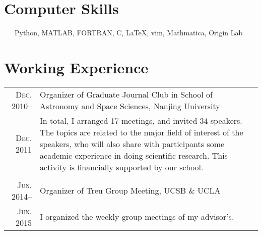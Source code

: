 \documentclass[letterpaper,10pt]{article}
\begin{document}
\vspace{1em}
\section{Computer Skills}
~~~Python, MATLAB, FORTRAN, C, \LaTeX, vim, Mathmatica, Origin Lab


\vspace{1em}
\section{Working Experience}
\begin{tabular}{rp{5.5in}}
\textsc{Dec. 2010}--  & Organizer of Graduate Journal Club in School of Astronomy and Space Sciences, Nanjing University \\
\textsc{Dec. 2011}    & \small{In total, I arranged 17 meetings, and invited 
34 speakers.
The topics are related to the major field of interest of the speakers, who will also share with participants some academic experience in doing scientific research. This activity is financially supported by our school.}  \\
\multicolumn{2}{c}{} \\
\textsc{Jun. 2014}--  & Organizer of Treu Group Meeting, UCSB \& UCLA \\
\textsc{Jun. 2015}    & \small{I organized the weekly group meetings of my 
advisor's.}     \\


\end{tabular}
\end{document}
